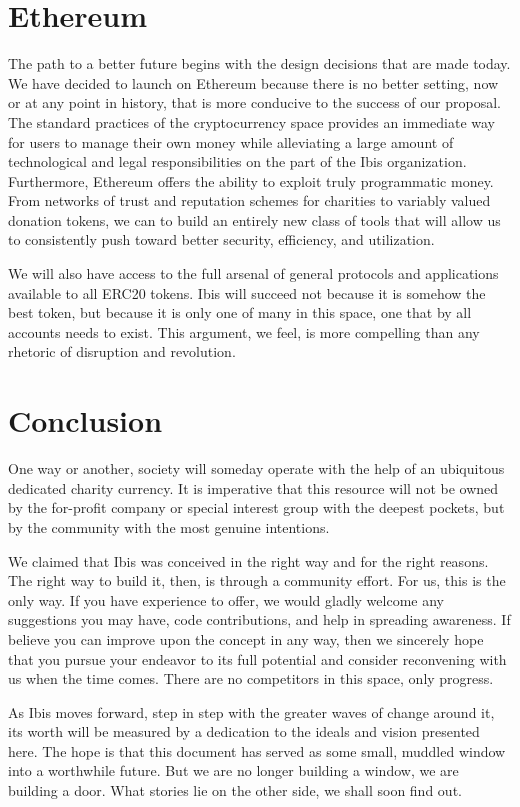 \documentclass{article} \usepackage{parskip}
\begin{document}
\section{Ethereum}

The path to a better future begins with the design decisions that are made
today. We have decided to launch on Ethereum because there is no better setting,
now or at any point in history, that is more conducive to the success of our
proposal. The standard practices of the cryptocurrency space provides an
immediate way for users to manage their own money while alleviating a large
amount of technological and legal responsibilities on the part of the Ibis
organization. Furthermore, Ethereum offers the ability to exploit truly
programmatic money. From networks of trust and reputation schemes for charities
to variably valued donation tokens, we can to build an entirely new class of
tools that will allow us to consistently push toward better security,
efficiency, and utilization.

We will also have access to the full arsenal of general protocols and
applications available to all ERC20 tokens. Ibis will succeed not because it is
somehow the best token, but because it is only one of many in this space, one
that by all accounts needs to exist. This argument, we feel, is more compelling
than any rhetoric of disruption and revolution.

\section{Conclusion}

One way or another, society will someday operate with the help of an ubiquitous
dedicated charity currency. It is imperative that this resource will not be
owned by the for-profit company or special interest group with the deepest
pockets, but by the community with the most genuine intentions.

We claimed that Ibis was conceived in the right way and for the right
reasons. The right way to build it, then, is through a community effort. For us,
this is the only way. If you have experience to offer, we would gladly welcome
any suggestions you may have, code contributions, and help in spreading
awareness. If believe you can improve upon the concept in any way, then we
sincerely hope that you pursue your endeavor to its full potential and consider
reconvening with us when the time comes. There are no competitors in this
space, only progress.

As Ibis moves forward, step in step with the greater waves of change around it,
its worth will be measured by a dedication to the ideals and vision presented
here. The hope is that this document has served as some small, muddled window
into a worthwhile future. But we are no longer building a window, we are
building a door. What stories lie on the other side, we shall soon find out.
\end{document}

